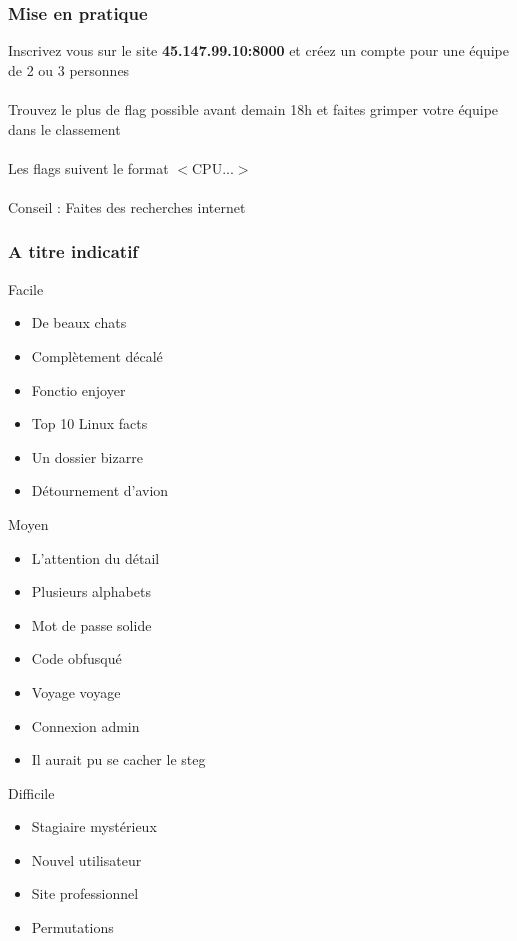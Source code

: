 \documentclass{beamer}
\begin{document}
\begin{frame}\frametitle{Mise en pratique}

Inscrivez vous sur le site \textbf{45.147.99.10:8000} et créez un compte pour une équipe de 2 ou 3 personnes \\~\\

Trouvez le plus de flag possible avant demain 18h et faites grimper votre équipe dans le classement \\~\\


Les flags suivent le format $<$CPU...$>$ \\~\\

Conseil : Faites des recherches internet


\end{frame}



\begin{frame}
\frametitle{A titre indicatif}
\fontsize{9}{12}\selectfont
\begin{multicols}{3}
    Facile
    \begin{itemize}
        \item De beaux chats
        \item Complètement décalé
        \item Fonctio enjoyer
        \item Top 10 Linux facts
        \item Un dossier bizarre
        \item Détournement d'avion
    \end{itemize}
    
    
    
    Moyen
    \begin{itemize}
        \item L'attention du détail
        \item Plusieurs alphabets
        \item Mot de passe solide
        \item Code obfusqué
        \item Voyage voyage
        \item Connexion admin
        \item Il aurait pu se cacher le steg
    \end{itemize}
    
    
    Difficile
    \begin{itemize}
        \item Stagiaire mystérieux
        \item Nouvel utilisateur
        \item Site professionnel
        \item Permutations
    \end{itemize}
    \hspace{10}


\end{multicols}

\end{frame}
\end{document}
